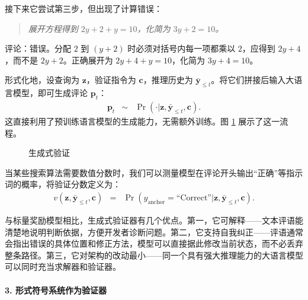 \vspace{0.5em}

接下来它尝试第三步，但出现了计算错误：
\vspace{0.5em}
\begin{quote}
\textit{展开方程得到 $2y + 2 + y = 10$，化简为 $3y + 2 = 10$。}
\end{quote}
\vspace{0.5em}

\begin{tcolorbox}[
    frame empty,
    colback=black!5,
    coltext=black
]

评论：错误。分配 $2$ 到 $(y+2)$ 时必须对括号内每一项都乘以 $2$，应得到 $2y + 4$，而不是 $2y + 2$。正确展开为 $2y + 4 + y = 10$，化简为 $3y + 4 = 10$。

\end{tcolorbox}

\vspace{0.5em}



形式化地，设查询为 $\mathbf{z}$，验证指令为 $\mathbf{c}$，推理历史为 $\bar{\mathbf{y}}_{\le t}$。将它们拼接后输入大语言模型，即可生成评论 $\mathbf{p}_t$：
\begin{eqnarray}
\mathbf{p}_t & \sim & \Pr(\cdot | \mathbf{z}, \bar{\mathbf{y}}_{\le t}, \mathbf{c}).
\end{eqnarray}
这直接利用了预训练语言模型的生成能力，无需额外训练。图 \ref{fig:pre-generative-verfication} 展示了这一流程。

\begin{figure}[!t]
\centering

\caption{生成式验证}
\label{fig:pre-generative-verfication}
\end{figure}

当某些搜索算法需要数值分数时，我们可以测量模型在评论开头输出“正确”等指示词的概率，将验证分数定义为：
\begin{eqnarray}
v(\mathbf{z}, \bar{\mathbf{y}}_{\le t}, \mathbf{c}) & = & \Pr(y_{\mathrm{anchor}} = \text{``Correct''} | \mathbf{z}, \bar{\mathbf{y}}_{\le t}, \mathbf{c}).
\end{eqnarray}

与标量奖励模型相比，生成式验证器有几个优点。第一，它可解释——文本评语能清楚地说明判断依据，方便开发者诊断问题。第二，它支持自我纠正——评语通常会指出错误的具体位置和修正方法，模型可以直接据此修改当前状态，而不必丢弃整条路径。第三，它对架构的改动最小——同一个具有强大推理能力的大语言模型可以同时充当求解器和验证器。

\paragraph{3. 形式符号系统作为验证器}

